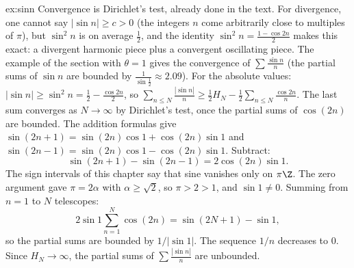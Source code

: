 \begin{solution}{ex:sinn}
\idea Convergence is Dirichlet's test, already done in the text. For divergence, one cannot say $|\sin n|\ge c>0$ (the integers $n$ come arbitrarily close to multiples of $\pi$), but $\sin^2n$ is on average $\frac12$, and the identity $\sin^2n=\frac{1-\cos2n}2$ makes this exact: a divergent harmonic piece plus a convergent oscillating piece.
\writeup The example of the section with $\theta=1$ gives the convergence of $\sum\frac{\sin n}n$ (the partial sums of $\sin n$ are bounded by $\frac1{\sin\frac12}\approx2.09$).
For the absolute values: $|\sin n|\ge\sin^2n=\frac12-\frac{\cos2n}2$, so $\sum_{n\le N}\frac{|\sin n|}n\ge\frac12H_N-\frac12\sum_{n\le N}\frac{\cos2n}n$. The last sum converges as $N\to\infty$ by Dirichlet's test, once the partial sums of $\cos(2n)$ are bounded. The addition formulas give $\sin(2n+1)=\sin(2n)\cos 1+\cos(2n)\sin 1$ and $\sin(2n-1)=\sin(2n)\cos 1-\cos(2n)\sin 1$. Subtract:
\[
\sin(2n+1)-\sin(2n-1)=2\cos(2n)\sin 1.
\]
The sign intervals of this chapter say that sine vanishes only on $\pi\Z$. The zero argument gave $\pi=2\alpha$ with $\alpha\ge\sqrt2$, so $\pi>2>1$, and $\sin 1\ne0$. Summing from $n=1$ to $N$ telescopes:
\[
2\sin 1\sum_{n=1}^N\cos(2n)=\sin(2N+1)-\sin 1,
\]
so the partial sums are bounded by $1/|\sin 1|$. The sequence $1/n$ decreases to $0$. Since $H_N\to\infty$, the partial sums of $\sum\frac{|\sin n|}n$ are unbounded.
\end{solution}

